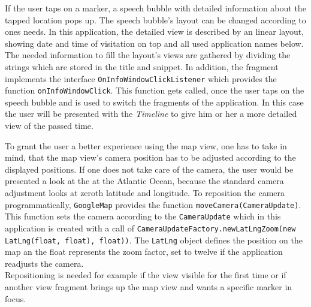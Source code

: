 If  the user taps on a marker, a speech bubble with detailed information about the tapped location pops up. The speech bubble's layout can be changed according to ones needs. In this application, the detailed view is described by an linear layout, showing date and time of visitation on top and all used application names below. The needed information to fill the layout's views are gathered by dividing the strings which are stored in the title and snippet. In addition, the fragment implements the interface \lstinline$OnInfoWindowClickListener$ which provides the function \lstinline$onInfoWindowClick$. This function gets called, once the user taps on the speech bubble and is used to switch the fragments of the application. In this case the user will be presented with the \emph{Timeline} to give him or her a more detailed view of the passed time.

To  grant the user a better experience using the map view, one has to take in mind, that the map view's camera position has to be adjusted according to the displayed positions. If one does not take care of the camera, the user would be presented a look at the at the Atlantic Ocean, because the standard camera adjustment looks at zeroth latitude and longitude. To reposition the camera programmatically, \lstinline$GoogleMap$ provides the function \lstinline$moveCamera(CameraUpdate)$. This function sets the camera according to the \lstinline$CameraUpdate$ which in this application is created with a call of \lstinline$CameraUpdateFactory.newLatLngZoom(new LatLng(float, float), float))$. The \lstinline$LatLng$ object defines the position on the map an the float represents the zoom factor, set to twelve if the application readjusts the camera.\\
Repositioning is needed for example if the view visible for the first time or if another view fragment brings up the map view and wants a specific marker in focus.

